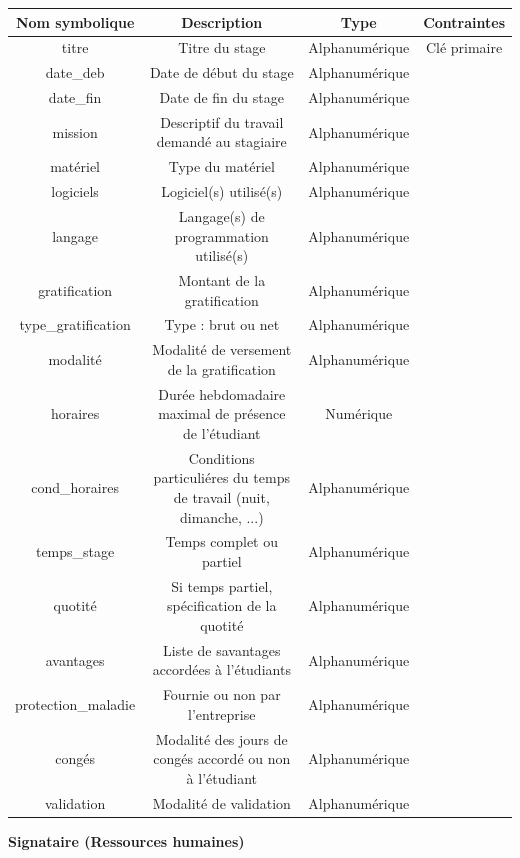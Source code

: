 \documentclass{scrreprt}
\begin{document}
\begin{tabular}{|c|c|c|c|}
\hline
\textbf{Nom symbolique} & \textbf{Description} & \textbf{Type} & \textbf{Contraintes} \\
\hline
titre & Titre du stage & Alphanum\'erique & Cl\'e primaire \\
date\_deb & Date de d\'ebut du stage & Alphanum\'erique & \\
date\_fin & Date de fin du stage & Alphanum\'erique & \\
mission & Descriptif du travail demand\'e au stagiaire & Alphanum\'erique & \\
mat\'eriel & Type du mat\'eriel & Alphanum\'erique & \\
logiciels & Logiciel(s) utilis\'e(s) & Alphanum\'erique & \\
langage & Langage(s) de programmation utilis\'e(s) & Alphanum\'erique & \\
gratification & Montant de la gratification & Alphanum\'erique & \\
type\_gratification & Type : brut ou net & Alphanum\'erique & \\
modalit\'e & Modalit\'e de versement de la gratification & Alphanum\'erique & \\
horaires & Dur\'ee hebdomadaire maximal de pr\'esence de l'\'etudiant & Num\'erique & \\
cond_horaires & Conditions particuli\'eres du temps de travail (nuit, dimanche, ...) & Alphanum\'erique & \\
temps_stage & Temps complet ou partiel & Alphanum\'erique & \\
quotit\'e & Si temps partiel, sp\'ecification de la quotit\'e & Alphanum\'erique & \\
avantages & Liste de savantages accord\'ees à l'\'etudiants & Alphanum\'erique & \\
protection\_maladie & Fournie ou non par l'entreprise & Alphanum\'erique & \\
cong\'es & Modalit\'e des jours de cong\'es accord\'e ou non à l'\'etudiant & Alphanum\'erique \\
validation & Modalit\'e de validation & Alphanum\'erique & \\
\hline
\end{tabular}

\begin{flushleft}
\textbf{Signataire (Ressources humaines)}
\end{flushleft}
\end{document}
